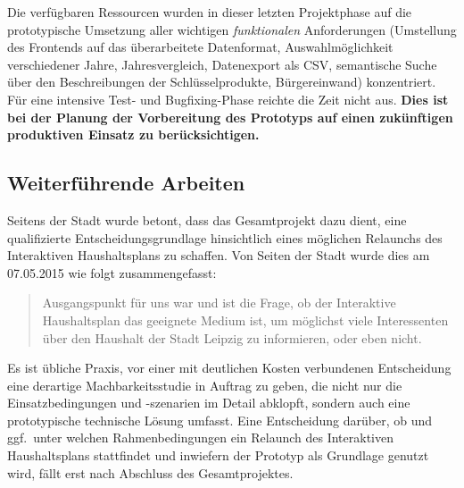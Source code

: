 \documentclass[11pt,a4paper,twoside]{article}
\begin{document}
Die verfügbaren Ressourcen wurden in dieser letzten Projektphase auf die
prototypische Umsetzung aller wichtigen \emph{funktionalen} Anforderungen
(Umstellung des Frontends auf das überarbeitete Datenformat,
Auswahlmöglichkeit verschiedener Jahre, Jahresvergleich, Datenexport als CSV,
semantische Suche über den Beschreibungen der Schlüsselprodukte,
Bürgereinwand) konzentriert. Für eine intensive Test- und Bugfixing-Phase
reichte die Zeit nicht aus. \textbf{Dies ist bei der Planung der Vorbereitung
  des Prototyps auf einen zukünftigen produktiven Einsatz zu
  berücksichtigen. }

\subsection{Weiterführende Arbeiten} 

Seitens der Stadt wurde betont, dass das Gesamtprojekt dazu dient, eine
qualifizierte Entscheidungsgrundlage hinsichtlich eines möglichen Relaunchs
des Interaktiven Haushaltsplans zu schaffen.  Von Seiten der Stadt wurde dies
am 07.05.2015 wie folgt zusammengefasst:
\begin{quote}
  Ausgangspunkt für uns war und ist die Frage, ob der Interaktive
  Haushaltsplan das geeignete Medium ist, um möglichst viele Interessenten
  über den Haushalt der Stadt Leipzig zu informieren, oder eben nicht.
\end{quote}
Es ist übliche Praxis, vor einer mit deutlichen Kosten verbundenen
Entscheidung eine derartige Machbarkeitsstudie in Auftrag zu geben, die nicht
nur die Einsatzbedingungen und -szenarien im Detail abklopft, sondern auch
eine prototypische technische Lösung umfasst. Eine Entscheidung darüber, ob
und ggf.\ unter welchen Rahmenbedingungen ein Relaunch des Interaktiven
Haushaltsplans stattfindet und inwiefern der Prototyp als Grundlage genutzt
wird, fällt erst nach Abschluss des Gesamtprojektes.
\end{document}
